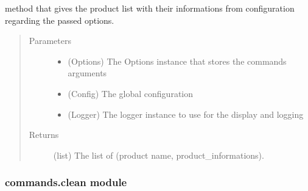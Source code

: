\documentclass[a4paper,10pt,english]{sphinxmanual}
\begin{document}
\begin{fulllineitems}
\label{\detokenize{apidoc_commands/commands:commands.check.get_products_list}}
method that gives the product list with their informations from 
configuration regarding the passed options.
\begin{quote}\begin{description}
\item[{Parameters}] \leavevmode\begin{itemize}
\item {} 
 \textendash{} (Options) The Options instance that stores 
the commands arguments

\item {} 
 \textendash{} (Config) The global configuration

\item {} 
 \textendash{} (Logger) The logger instance to use 
for the display and logging

\end{itemize}

\item[{Returns}] \leavevmode
(list) The list of (product name, product\_informations).

\end{description}\end{quote}

\end{fulllineitems}



\subsubsection{commands.clean module}
\label{\detokenize{apidoc_commands/commands:commands-clean-module}}\label{\detokenize{apidoc_commands/commands:module-commands.clean}}
\end{document}
